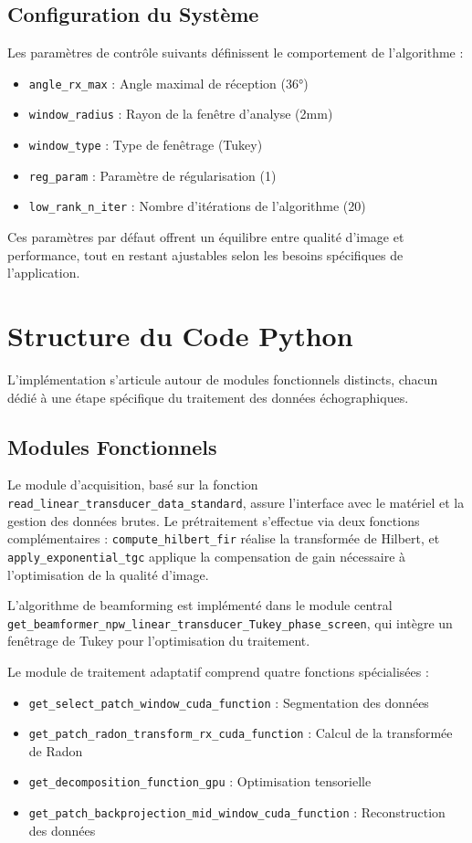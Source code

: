 \documentclass[12pt,a4paper]{article}
\begin{document}
\subsection{Configuration du Système}
Les paramètres de contrôle suivants définissent le comportement de l'algorithme :
\begin{itemize}
    \item \texttt{angle\_rx\_max} : Angle maximal de réception (36°)
    \item \texttt{window\_radius} : Rayon de la fenêtre d'analyse (2mm)
    \item \texttt{window\_type} : Type de fenêtrage (Tukey)
    \item \texttt{reg\_param} : Paramètre de régularisation (1)
    \item \texttt{low\_rank\_n\_iter} : Nombre d'itérations de l'algorithme (20)
\end{itemize}

\bigskip
Ces paramètres par défaut offrent un équilibre entre qualité d'image et performance, tout en restant ajustables selon les besoins spécifiques de l'application.

\section{Structure du Code Python}

L'implémentation s'articule autour de modules fonctionnels distincts, chacun dédié à une étape spécifique du traitement des données échographiques.

\subsection{Modules Fonctionnels}
Le module d'acquisition, basé sur la fonction \texttt{read\_linear\_transducer\_data\_standard}, assure l'interface avec le matériel et la gestion des données brutes. Le prétraitement s'effectue via deux fonctions complémentaires : \texttt{compute\_hilbert\_fir} réalise la transformée de Hilbert, et \texttt{apply\_exponential\_tgc} applique la compensation de gain nécessaire à l'optimisation de la qualité d'image.

L'algorithme de beamforming est implémenté dans le module central \\ \texttt{get\_beamformer\_npw\_linear\_transducer\_Tukey\_phase\_screen}, qui intègre un fenêtrage de Tukey pour l'optimisation du traitement.

Le module de traitement adaptatif comprend quatre fonctions spécialisées :
\begin{itemize}
    \item \texttt{get\_select\_patch\_window\_cuda\_function} : Segmentation des données
    \item \texttt{get\_patch\_radon\_transform\_rx\_cuda\_function} : Calcul de la transformée de Radon
    \item \texttt{get\_decomposition\_function\_gpu} : Optimisation tensorielle
    \item \texttt{get\_patch\_backprojection\_mid\_window\_cuda\_function} : Reconstruction des données
\end{itemize}
\end{document}

